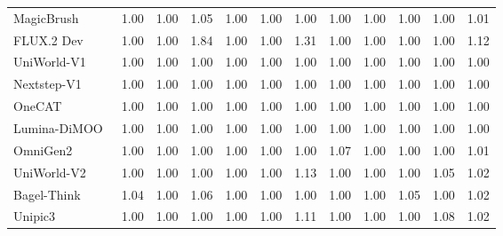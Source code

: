 \begin{table}[t]
{\begin{tabular}{l|cccccccccc|c}
            MagicBrush~\cite{zhang2023magicbrush}
            & 1.00 & 1.00 & 1.05 & 1.00 & 1.00 & 1.00 & 1.00 & 1.00 & 1.00 & 1.00
            & \cellcolor[HTML]{C8C8C8}1.01 \\

            FLUX.2 Dev~\cite{flux-2-2025}
            & 1.00 & 1.00 & 1.84 & 1.00 & 1.00 & 1.31 & 1.00 & 1.00 & 1.00 & 1.00
            & \cellcolor[HTML]{C8C8C8}1.12  \\

            \midrule

            UniWorld-V1~\cite{lin2025uniworld}
            & 1.00 & 1.00 & 1.00 & 1.00 & 1.00 & 1.00 & 1.00 & 1.00 & 1.00 & 1.00
            & \cellcolor[HTML]{C8C8C8}1.00 \\

            Nextstep-V1~\cite{han2025nextstep}
            & 1.00 & 1.00 & 1.00 & 1.00 & 1.00 & 1.00 & 1.00 & 1.00 & 1.00 & 1.00
            & \cellcolor[HTML]{C8C8C8}1.00 \\

            OneCAT~\cite{li2025onecat}
            & 1.00 & 1.00 & 1.00 & 1.00 & 1.00 & 1.00 & 1.00 & 1.00 & 1.00 & 1.00
            & \cellcolor[HTML]{C8C8C8}1.00 \\

            Lumina-DiMOO~\cite{xin2025lumina}
            & 1.00 & 1.00 & 1.00 & 1.00 & 1.00 & 1.00 & 1.00 & 1.00 & 1.00 & 1.00
            & \cellcolor[HTML]{C8C8C8}1.00 \\

            OmniGen2~\cite{wu2025omnigen2}
            & 1.00 & 1.00 & 1.00 & 1.00 & 1.00 & 1.00 & 1.07 & 1.00 & 1.00 & 1.00
            & \cellcolor[HTML]{C8C8C8}1.01  \\

            UniWorld-V2~\cite{li2025uniworld}
            & 1.00 & 1.00 & 1.00 & 1.00 & 1.00 & 1.13 & 1.00 & 1.00 & 1.00 & 1.05
            & \cellcolor[HTML]{C8C8C8}1.02 \\

            Bagel-Think~\cite{deng2025emerging}
            & 1.04 & 1.00 & 1.06 & 1.00 & 1.00 & 1.00 & 1.00 & 1.00 & 1.05 & 1.00
            & \cellcolor[HTML]{C8C8C8}1.02 \\

            Unipic3~\cite{wei2026skywork}
            & 1.00 & 1.00 & 1.00 & 1.00 & 1.00 & 1.11 & 1.00 & 1.00 & 1.00 & 1.08
            & \cellcolor[HTML]{C8C8C8}1.02 \\


\end{tabular}}
\end{table}
